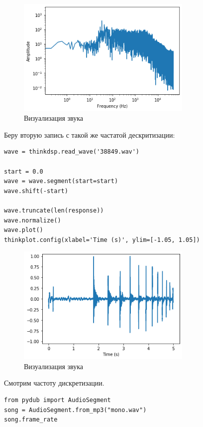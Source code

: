 \documentclass[a4paper,12pt]{report}
\begin{document}
\begin{figure}[H]
        \centering
        \includegraphics[width=0.75\textwidth]{11.png}
        \caption{Визуализация звука}
        \label{11}
\end{figure}

Беру вторую запись с такой же частатой дескритизации:

\begin{lstlisting}[caption=Загрузка звука]
wave = thinkdsp.read_wave('38849.wav')

start = 0.0
wave = wave.segment(start=start)
wave.shift(-start)

wave.truncate(len(response))
wave.normalize()
wave.plot()
thinkplot.config(xlabel='Time (s)', ylim=[-1.05, 1.05])
\end{lstlisting}

\begin{figure}[H]
        \centering
        \includegraphics[width=0.75\textwidth]{12.png}
        \caption{Визуализация звука}
        \label{12}
\end{figure}

Смотрим частоту дискретизации.

\begin{lstlisting}[caption=Частота дискретизации 1]
from pydub import AudioSegment
song = AudioSegment.from_mp3("mono.wav")
song.frame_rate
\end{lstlisting}
\end{document}
